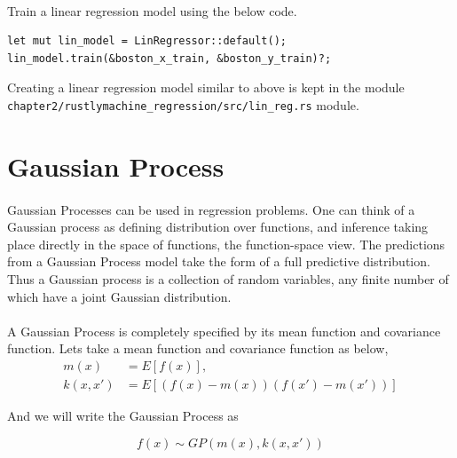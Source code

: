 \documentclass{book}
\begin{document}
\paragraph{}%
Train a linear regression model using the below code.
\label{par:}

\begin{lstlisting}[caption={chapter2\\/rustlymachine\_regression\\/src\\/lin\_reg\\.rs}]
let mut lin_model = LinRegressor::default();
lin_model.train(&boston_x_train, &boston_y_train)?;
\end{lstlisting}

Creating a linear regression model similar to above is kept in the module \lstinline{chapter2/rustlymachine_regression/src/lin_reg.rs} module.

\label{sub:linear_regression_with_ols_and_gradient_descent}

\section{Gaussian Process}%
\paragraph{}%
Gaussian Processes can be used in regression problems. One can think of a Gaussian process as defining distribution over functions, and inference taking place directly in the space of functions, the function-space view. The predictions from a Gaussian Process model take the form of a full predictive distribution. Thus a Gaussian  process is a collection of random variables, any finite number of which have a joint Gaussian distribution.
\label{par:}
\paragraph{}%
A Gaussian Process is completely specified by its mean function and covariance function. Lets take a mean function and covariance function as below,
\label{par:paragraph_name}
\begin{align}
	m(x) & = E[f(x)],	\\
	k(x, x') & = E[(f(x) - m(x))(f(x') - m(x'))]
\end{align}

And we will write the Gaussian Process as

\begin{equation}
	f(x) \sim GP(m(x), k(x, x'))
\end{equation}
\end{document}
